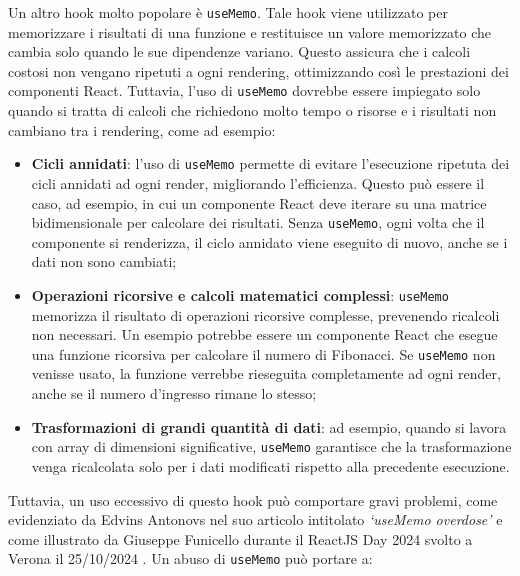 \documentclass[target=bach,aauheader=,style=]{thud}
\begin{document}
\noindent Un altro hook molto popolare è \texttt{useMemo}\cite{pasnitsenko2024optimizing}. Tale hook viene utilizzato per memorizzare i risultati di una funzione e restituisce un valore memorizzato che cambia solo quando le sue dipendenze variano. Questo assicura che i calcoli costosi non vengano ripetuti a ogni rendering, ottimizzando così le prestazioni dei componenti React\cite{bugl2019learn}. Tuttavia, l'uso di \texttt{useMemo} dovrebbe essere impiegato solo quando si tratta di calcoli che richiedono molto tempo o risorse e i risultati non cambiano tra i rendering, come ad esempio:

\begin{itemize}
    \item \textbf{Cicli annidati}: l'uso di \texttt{useMemo} permette di evitare l'esecuzione ripetuta dei cicli annidati ad ogni render, migliorando l'efficienza. Questo può essere il caso, ad esempio, in cui un componente React deve iterare su una matrice bidimensionale per calcolare dei risultati. Senza \texttt{useMemo}, ogni volta che il componente si renderizza, il ciclo annidato viene eseguito di nuovo, anche se i dati non sono cambiati;
    \item \textbf{Operazioni ricorsive e calcoli matematici complessi}: \texttt{useMemo} memorizza il risultato di operazioni ricorsive complesse, prevenendo ricalcoli non necessari. Un esempio potrebbe essere un componente React che esegue una funzione ricorsiva per calcolare il numero di Fibonacci. Se \texttt{useMemo} non venisse usato, la funzione verrebbe rieseguita completamente ad ogni render, anche se il numero d'ingresso rimane lo stesso;
    \item \textbf{Trasformazioni di grandi quantità di dati}: ad esempio, quando si lavora con array di dimensioni significative, \texttt{useMemo} garantisce che la trasformazione venga ricalcolata solo per i dati modificati rispetto alla precedente esecuzione.
\end{itemize}

\noindent Tuttavia, un uso eccessivo di questo hook può comportare gravi problemi, come evidenziato da Edvins Antonovs nel suo articolo intitolato \textit{`useMemo overdose'} \cite{edvins2024usememo} e come illustrato da Giuseppe Funicello durante il ReactJS Day 2024 svolto a Verona il 25/10/2024 \cite{funicello2024reactjsday}. Un abuso di \texttt{useMemo} può portare a:
\end{document}
